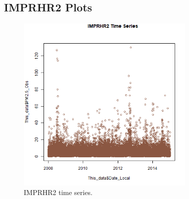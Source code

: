 
\subsection{IMPRHR2 Plots}
\begin{figure} 
\centering 
\includegraphics[width=0.77\textwidth]{Code_Outputs/IMPRHR2_time_series.png} 
\caption{\label{fig:IMPRHR2TS}IMPRHR2 time series.} 
\end{figure} 
 
